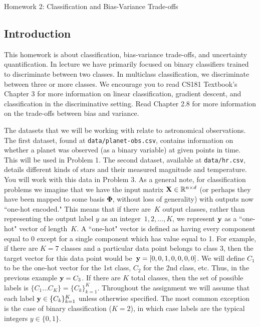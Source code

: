 \documentclass[submit]{harvardml}
\begin{document}
\begin{center}
{\Large Homework 2: Classification and Bias-Variance Trade-offs}\\
\end{center}

\subsection*{Introduction}

This homework is about classification, bias-variance trade-offs, and uncertainty quantification. In lecture we have primarily focused on binary classifiers trained to discriminate between two classes. In multiclass classification, we
discriminate between three or more classes. 
We encourage you to read
CS181 Textbook's Chapter 3 for more information on linear
classification, gradient descent, and classification in the discriminative setting. Read Chapter 2.8 for more
information on the trade-offs between bias and variance.

The datasets that we will be working with relate to astronomical observations. The first dataset, found at \verb|data/planet-obs.csv|, contains information on whether a planet was observed (as a binary variable) at given points in time. This will be used in Problem 1. The second dataset, available at \verb|data/hr.csv|, details different kinds of stars and their measured magnitude and temperature. You will work with this data in Problem 3.
As a general note, for classification problems we imagine that we have
the input matrix $\mathbf{X} \in \mathbb{R}^{n \times d}$ (or perhaps they
have been mapped to some basis $\bm{\Phi}$, without loss of
generality) with outputs now ``one-hot encoded."  This means that if
there are~$K$ output classes, rather than representing the output
label $y$ as an integer~${1,2,\ldots,K}$, we represent $\mathbf{y}$ as a
``one-hot" vector of length~$K$. A ``one-hot" vector is defined as
having every component equal to 0 except for a single component which
has value equal to 1.  For example, if there are $K = 7$ classes and a
particular data point belongs to class 3, then the target vector for
this data point would be~$\mathbf{y} = [0,0,1,0,0,0,0]$.  We will define
$C_1$ to be the one-hot vector for the 1st class, $C_2$ for the 2nd
class, etc.  Thus, in the previous example $\mathbf{y} = C_3$. If there
are $K$ total classes, then the set of possible labels is $\{C_1
\ldots C_K \} = \{C_k\}_{k=1}^K$.  Throughout the assignment we will
assume that each label $\mathbf{y} \in \{C_k\}_{k=1}^K$ unless otherwise
specified. The most common exception is the case of binary classification
($K = 2$), in which case labels are the typical integers $y \in \{0, 1\}$.
\end{document}
